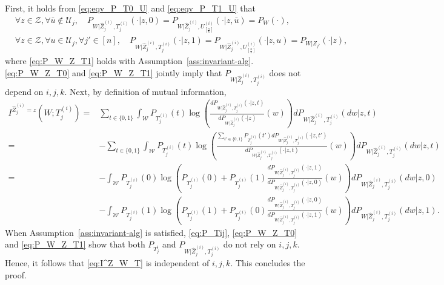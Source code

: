 \documentclass[onecolumn,romanappendices,10pt]{IEEEtran}
\newcommand{\Ucal}{{\mathcal U}}
\newcommand{\Wcal}{{\mathcal W}}
\newcommand{\Zcal}{{\mathcal Z}}
\begin{document}
	First, it holds from \eqref{eq:eqv_P_T0_U} and \eqref{eq:eqv_P_T1_U} that
	\begin{align}
		&\forall z \in \Zcal, \forall \bar{u} \not\in \Ucal_j, \quad P_{W | \hat{Z}^{(i)}_j, T^{(i)}_j}(\cdot | z, 0) = P_{W | \hat{Z}^{(i)}_j, U^{(i)}_{[\frac{n}{k}]}}(\cdot | z, \bar{u}) = P_{W}(\cdot), \label{eq:P_W_Z_T0} \\
		&\forall z \in \Zcal, \forall u \in \Ucal_j, \forall j' \in [n], \quad P_{W | \hat{Z}^{(i)}_j, T^{(i)}_j}(\cdot | z, 1) = P_{W | \hat{Z}^{(i)}_j, U^{(i)}_{[\frac{n}{k}]}}(\cdot | z, u) = P_{W | Z_{j'}}(\cdot | z),  \label{eq:P_W_Z_T1}
	\end{align}
	where \eqref{eq:P_W_Z_T1} holds with Assumption~\ref{ass:invariant-alg}. \eqref{eq:P_W_Z_T0} and \eqref{eq:P_W_Z_T1} jointly imply that $P_{W | \hat{Z}^{(i)}_j, T^{(i)}_j}$ does not depend on $i,j,k$. Next, by definition of mutual information,
	\begin{equation}
		\begin{aligned}
			I^{\hat{Z}^{(i)}_j = z}\left( W; T^{(i)}_j \right) =& \sum_{t \in \{0,1\}} \int_{\Wcal} P_{T^{(i)}_j}(t) \log \left( \frac{d P_{W | \hat{Z}^{(i)}_j, T^{(i)}_j}(\cdot | z, t)}{d P_{W | \hat{Z}^{(i)}_j}(\cdot | z)}(w) \right) d P_{W | \hat{Z}^{(i)}_j, T^{(i)}_j}(d w | z, t)\\
			=& -\sum_{t \in \{0,1\}} \int_{\Wcal} P_{T^{(i)}_j}(t) \log \left( \frac{\sum_{t' \in \{0,1\}}P_{T^{(i)}_j}(t') d P_{W | \hat{Z}^{(i)}_j, T^{(i)}_j}(\cdot | z, t')}{d P_{W | \hat{Z}^{(i)}_j, T^{(i)}_j}(\cdot | z, t)}(w) \right) d P_{W | \hat{Z}^{(i)}_j, T^{(i)}_j}(d w | z, t) \\
			=& - \int_{\Wcal} P_{T^{(i)}_j}(0) \log \left( P_{T^{(i)}_j}(0) + P_{T^{(i)}_j}(1) \frac{d P_{W | \hat{Z}^{(i)}_j, T^{(i)}_j}(\cdot | z, 1)}{d P_{W | \hat{Z}^{(i)}_j, T^{(i)}_j}(\cdot | z, 0)}(w) \right) d P_{W | \hat{Z}^{(i)}_j, T^{(i)}_j}(d w | z, 0) \\
			&- \int_{\Wcal} P_{T^{(i)}_j}(1) \log \left( P_{T^{(i)}_j}(1) + P_{T^{(i)}_j}(0) \frac{d P_{W | \hat{Z}^{(i)}_j, T^{(i)}_j}(\cdot | z, 0)}{d P_{W | \hat{Z}^{(i)}_j, T^{(i)}_j}(\cdot | z, 1)}(w) \right) d P_{W | \hat{Z}^{(i)}_j, T^{(i)}_j}(d w | z, 1).
		\end{aligned}\label{eq:I^Z_W_T}
	\end{equation}
	When Assumption~\ref{ass:invariant-alg} is satisfied, \eqref{eq:P_Tij}, \eqref{eq:P_W_Z_T0} and \eqref{eq:P_W_Z_T1} show that both $P_{T^{i}_j}$ and $P_{W | \hat{Z}^{(i)}_j, T^{(i)}_j}$ do not rely on $i,j,k$. Hence, it follows that \eqref{eq:I^Z_W_T} is independent of $i,j,k$. This concludes the proof.
	
\end{document}

